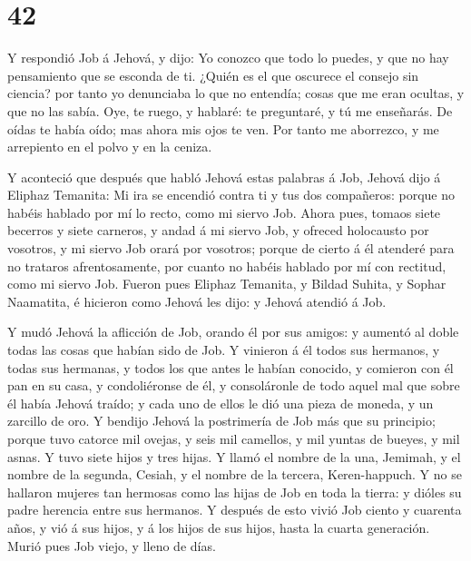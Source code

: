 \hypertarget{section-41}{%
\section{42}\label{section-41}}

 Y respondió Job á Jehová, y dijo:  Yo conozco
que todo lo puedes, y que no hay pensamiento que se esconda de ti.
 ¿Quién es el que oscurece el consejo sin ciencia? por tanto
yo denunciaba lo que no entendía; cosas que me eran ocultas, y que no
las sabía.  Oye, te ruego, y hablaré: te preguntaré, y tú me
enseñarás.  De oídas te había oído; mas ahora mis ojos te
ven.  Por tanto me aborrezco, y me arrepiento en el polvo y
en la ceniza.

 Y aconteció que después que habló Jehová estas palabras á
Job, Jehová dijo á Eliphaz Temanita: Mi ira se encendió contra ti y tus
dos compañeros: porque no habéis hablado por mí lo recto, como mi siervo
Job.  Ahora pues, tomaos siete becerros y siete carneros, y
andad á mi siervo Job, y ofreced holocausto por vosotros, y mi siervo
Job orará por vosotros; porque de cierto á él atenderé para no trataros
afrentosamente, por cuanto no habéis hablado por mí con rectitud, como
mi siervo Job.  Fueron pues Eliphaz Temanita, y Bildad
Suhita, y Sophar Naamatita, é hicieron como Jehová les dijo: y Jehová
atendió á Job.

 Y mudó Jehová la aflicción de Job, orando él por sus
amigos: y aumentó al doble todas las cosas que habían sido de Job.
 Y vinieron á él todos sus hermanos, y todas sus hermanas,
y todos los que antes le habían conocido, y comieron con él pan en su
casa, y condoliéronse de él, y consoláronle de todo aquel mal que sobre
él había Jehová traído; y cada uno de ellos le dió una pieza de moneda,
y un zarcillo de oro.  Y bendijo Jehová la postrimería de
Job más que su principio; porque tuvo catorce mil ovejas, y seis mil
camellos, y mil yuntas de bueyes, y mil asnas.  Y tuvo
siete hijos y tres hijas.  Y llamó el nombre de la una,
Jemimah, y el nombre de la segunda, Cesiah, y el nombre de la tercera,
Keren-happuch.  Y no se hallaron mujeres tan hermosas como
las hijas de Job en toda la tierra: y dióles su padre herencia entre sus
hermanos.  Y después de esto vivió Job ciento y cuarenta
años, y vió á sus hijos, y á los hijos de sus hijos, hasta la cuarta
generación.  Murió pues Job viejo, y lleno de días.
